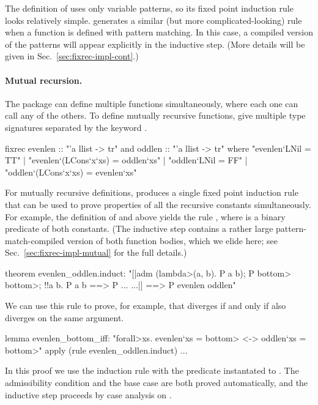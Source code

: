 The definition of  uses only variable patterns, so its fixed point induction rule looks relatively simple. {\fixrec} generates a similar (but more complicated-looking) rule when a function is defined with pattern matching. In this case, a compiled version of the patterns will appear explicitly in the inductive step. (More details will be given in Sec.~\ref{sec:fixrec-impl-cont}.)

\paragraph{Mutual recursion.} The {\fixrec} package can define multiple functions simultaneously, where each one can call any of the others. To define mutually recursive functions, give multiple type signatures separated by the keyword .
%
\begin{isacode}
fixrec evenlen :: "'a llist -> tr" and oddlen :: "'a llist -> tr"
  where "evenlen`LNil = TT"
  | "evenlen`(LCons`x`xs) = oddlen`xs"
  | "oddlen`LNil = FF"
  | "oddlen`(LCons`x`xs) = evenlen`xs"
\end{isacode}
%
For mutually recursive definitions, {\fixrec} produces a single fixed point induction rule that can be used to prove properties of all the recursive constants simultaneously. For example, the definition of  and  above yields the rule , where  is a binary predicate of both constants. (The inductive step contains a rather large pattern-match-compiled version of both function bodies, which we elide here; see Sec.~\ref{sec:fixrec-impl-mutual} for the full details.)
%
\begin{isacode}
theorem evenlen_oddlen.induct:
  "[|adm (\<lambda>(a, b). P a b); P \<bottom> \<bottom>; !!a b. P a b ==> P ... ...|]
    ==> P evenlen oddlen"
\end{isacode}
%
We can use this rule to prove, for example, that  diverges if and only if  also diverges on the same argument.
%
\begin{isacode}
lemma evenlen_bottom_iff: "\<forall>xs. evenlen`xs = \<bottom> <-> oddlen`xs = \<bottom>"
  apply (rule evenlen_oddlen.induct) ...
\end{isacode}
%
In this proof we use the induction rule  with the predicate  instantated to . The admissibility condition and the base case are both proved automatically, and the inductive step proceeds by case analysis on .

